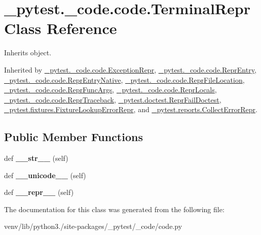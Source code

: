 \hypertarget{class__pytest_1_1__code_1_1code_1_1_terminal_repr}{}\section{\+\_\+pytest.\+\_\+code.\+code.\+Terminal\+Repr Class Reference}
\label{class__pytest_1_1__code_1_1code_1_1_terminal_repr}


Inherits object.



Inherited by \hyperlink{class__pytest_1_1__code_1_1code_1_1_exception_repr}{\+\_\+pytest.\+\_\+code.\+code.\+Exception\+Repr}, \hyperlink{class__pytest_1_1__code_1_1code_1_1_repr_entry}{\+\_\+pytest.\+\_\+code.\+code.\+Repr\+Entry}, \hyperlink{class__pytest_1_1__code_1_1code_1_1_repr_entry_native}{\+\_\+pytest.\+\_\+code.\+code.\+Repr\+Entry\+Native}, \hyperlink{class__pytest_1_1__code_1_1code_1_1_repr_file_location}{\+\_\+pytest.\+\_\+code.\+code.\+Repr\+File\+Location}, \hyperlink{class__pytest_1_1__code_1_1code_1_1_repr_func_args}{\+\_\+pytest.\+\_\+code.\+code.\+Repr\+Func\+Args}, \hyperlink{class__pytest_1_1__code_1_1code_1_1_repr_locals}{\+\_\+pytest.\+\_\+code.\+code.\+Repr\+Locals}, \hyperlink{class__pytest_1_1__code_1_1code_1_1_repr_traceback}{\+\_\+pytest.\+\_\+code.\+code.\+Repr\+Traceback}, \hyperlink{class__pytest_1_1doctest_1_1_repr_fail_doctest}{\+\_\+pytest.\+doctest.\+Repr\+Fail\+Doctest}, \hyperlink{class__pytest_1_1fixtures_1_1_fixture_lookup_error_repr}{\+\_\+pytest.\+fixtures.\+Fixture\+Lookup\+Error\+Repr}, and \hyperlink{class__pytest_1_1reports_1_1_collect_error_repr}{\+\_\+pytest.\+reports.\+Collect\+Error\+Repr}.

\subsection*{Public Member Functions}
\begin{DoxyCompactItemize}
\item 
\mbox{\label{class__pytest_1_1__code_1_1code_1_1_terminal_repr_a70b4e906104473b7d53fea236599c96f}} 
def {\bfseries \+\_\+\+\_\+str\+\_\+\+\_\+} (self)
\item 
\mbox{\label{class__pytest_1_1__code_1_1code_1_1_terminal_repr_a08f03a946536ebca2227098460c84c94}} 
def {\bfseries \+\_\+\+\_\+unicode\+\_\+\+\_\+} (self)
\item 
\mbox{\label{class__pytest_1_1__code_1_1code_1_1_terminal_repr_a241972632fd1ae6c29bb1345501689a0}} 
def {\bfseries \+\_\+\+\_\+repr\+\_\+\+\_\+} (self)
\end{DoxyCompactItemize}


The documentation for this class was generated from the following file\+:\begin{DoxyCompactItemize}
\item 
venv/lib/python3./site-\/packages/\+\_\+pytest/\+\_\+code/code.\+py\end{DoxyCompactItemize}
